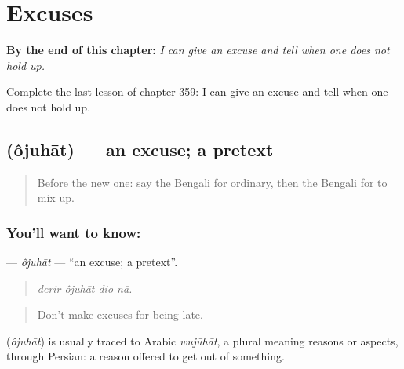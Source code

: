 
\chapter{Excuses}
\label{ch:bn-excuses}

\begin{chapteropening}
\textbf{By the end of this chapter:} \emph{I can give an excuse and tell when one does not hold up.}

Complete the last lesson of chapter 359: I can give an excuse and tell when one does not hold up.
\end{chapteropening}

\section[\texorpdfstring{\bn{অজুহাত} (ôjuhāt)}{অজুহাত (ôjuhāt)}]{ (ôjuhāt) — an excuse; a pretext}

\label{lesson:BN-C359-ojuhat}



\begin{quote}
Before the new one: say the Bengali for ordinary, then the Bengali for to mix up.
\end{quote}

\subsection*{You'll want to know: }
\textbf{} — \emph{ôjuhāt} — \textquotedblleft{}an excuse; a pretext\textquotedblright{}.

\begin{quote}
   
\end{quote}

\begin{quote}
\emph{derir ôjuhāt dio nā.}
\end{quote}

\begin{quote}
Don't make excuses for being late.
\end{quote}

\begin{cousinweb}
\textbf{} (\emph{ôjuhāt}) is usually traced to Arabic \emph{wujūhāt}, a plural meaning reasons or aspects, through Persian: a reason offered to get out of something.
\end{cousinweb}

